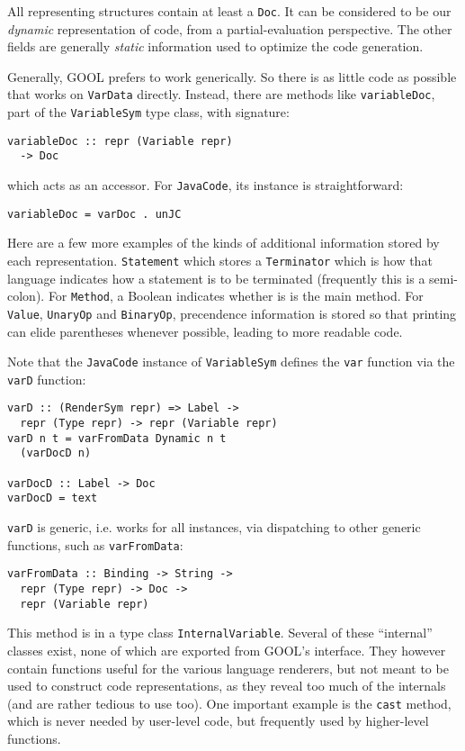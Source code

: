 \documentclass[sigplan,review,anonymous,prologue,dvipsnames]{acmart}
\begin{document}
All representing structures contain at least a \verb|Doc|. It can be considered
to be our \emph{dynamic} representation of code, from a partial-evaluation
perspective. The other fields are generally \emph{static} information used to
optimize the code generation.

Generally, GOOL prefers to work generically. So there is as little code as
possible that works on \verb|VarData| directly.  Instead, there are
methods like \verb|variableDoc|, part of the \verb|VariableSym| type class,
with signature:
\begin{lstlisting}
variableDoc :: repr (Variable repr) 
  -> Doc
\end{lstlisting}
which acts as an accessor.  For \verb|JavaCode|, its instance is
straightforward:
\begin{lstlisting}
variableDoc = varDoc . unJC
\end{lstlisting}

Here are a few more examples of the kinds of additional information stored by
each representation. \verb|Statement| which stores a
\verb|Terminator| which is how that language indicates how a statement is to be
terminated (frequently this is a semi-colon).  For \verb|Method|, a Boolean
indicates whether is is the main method.  For \verb|Value|, \verb|UnaryOp|
and \verb|BinaryOp|, precendence information is stored so that printing can
elide parentheses whenever possible, leading to more readable code.

Note that the \verb|JavaCode| instance of \verb|VariableSym| defines the
\verb|var| function via the \verb|varD| function:
\begin{lstlisting}
varD :: (RenderSym repr) => Label -> 
  repr (Type repr) -> repr (Variable repr)
varD n t = varFromData Dynamic n t 
  (varDocD n)

varDocD :: Label -> Doc
varDocD = text
\end{lstlisting}
\verb|varD| is generic, i.e. works for all instances, via dispatching to other
generic functions, such as \verb|varFromData|:
\begin{lstlisting}
varFromData :: Binding -> String -> 
  repr (Type repr) -> Doc -> 
  repr (Variable repr)
\end{lstlisting}
This method is in a type class \verb|InternalVariable|. Several of these
``internal'' classes exist, none of which are exported from GOOL's interface.
They however contain functions useful for the various language renderers, but
not meant to be used to construct code representations, as they reveal too
much of the internals (and are rather tedious to use too).  One important
example is the \verb|cast| method, which is never needed by user-level code,
but frequently used by higher-level functions.
\end{document}
